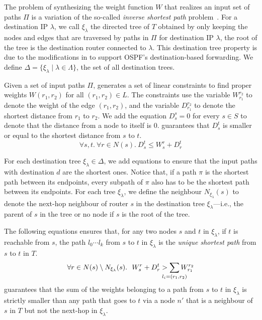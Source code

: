 The problem of synthesizing the weight function $W$ that
realizes an input set of paths $\Pi$ is
a
variation of the so-called {\em inverse shortest path} 
problem~\cite{isp}. 
For a destination IP $\lambda$, we call $\xi_\lambda$ 
the directed tree of $T$ 
obtained by only keeping the nodes and edges 
that are traversed by paths in $\Pi$ for 
destination IP $\lambda$, the root of the tree
is the destination router connected to $\lambda$. 
 This destination tree
 property is due to the modifications in \genesis
 to support OSPF's destination-based forwarding. We
 define $\Delta=\{\xi_\lambda\mid \lambda \in \Lambda\}$,   
the set of all destination trees. 

Given a set of input paths $\Pi$, \name 
generates a set of linear constraints to 
find proper weights $W(r_1,r_2)$ 
for all $(r_1, r_2) \in L$.
The constraints use the variable $W_{r_1}^{r_2}$
to denote the weight of the edge $(r_1, r_2)$, and the variable
$D_{r_1}^{r_2}$ to denote the 
shortest distance from $r_1$ to $r_2$.
We add the equation $D_{s}^{s} = 0$ 
for every $s\in S$ to denote that the distance
from a node to itself is $0$.
 guarantees that $D_{s}^{t}$ is smaller or equal to
the shortest distance from $s$ to $t$.
\begin{equation} \label{eq:dist}
\forall s, t. ~\forall r \in N(s).~
D_s^t \leq W_s^r + D_r^t
\end{equation}

For each destination tree $\xi_\lambda\in\Delta$, we add equations to ensure 
that the input paths with destination $d$ are the shortest ones.
Notice that, if a path $\pi$
is the shortest path between its endpoints, every 
subpath of $\pi$ also has to be the shortest path between its endpoints.
For each tree $\xi_\lambda$, we define the neighbour
 $N_{\xi_\lambda}(s)$ to denote the 
next-hop neighbour of router $s$ in the destination tree $\xi_\lambda$---i.e., the parent
of $s$ in the tree or no node if $s$ is the root of the tree.

The following equations ensures that, for any 
 two nodes $s$ and $t$ in
$\xi_\lambda$, if $t$ is reachable from $s$, 
the path $l_0\cdots l_k$ from $s$ to $t$ in $\xi_\lambda$ is the 
\emph{unique shortest path} from $s$ to $t$ in $T$.
\begin{multline} \label{eq:uniq1}
\forall r \in N(s) \setminus N_{\xi_\lambda}(s).~~
W_{s}^{r}+ D_{r}^{t} > \sum_{\mathclap{\substack{l_i=(r_1,r_2)}}} 
W_{r_1}^{r_2}
\end{multline}
 guarantees that 
the sum of the weights belonging to a path from $s$ to $t$ in $\xi_\lambda$ 
is strictly smaller than 
any path that goes to $t$ via 
a node $n'$ that is a neighbour of $s$ in $T$ but not 
the next-hop in $\xi_\lambda$.

